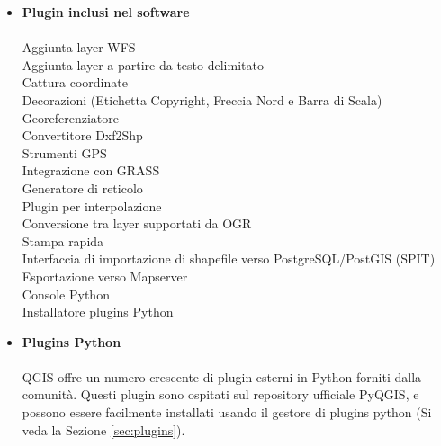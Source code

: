 \begin{itemize}
\item \textbf{Plugin inclusi nel software}
\\ \\ Aggiunta layer WFS
\\ Aggiunta layer a partire da testo delimitato
\\ Cattura coordinate
\\ Decorazioni (Etichetta Copyright, Freccia Nord e Barra di Scala)
\\ Georeferenziatore
\\ Convertitore Dxf2Shp
\\ Strumenti GPS
\\ Integrazione con GRASS
\\ Generatore di reticolo
\\ Plugin per interpolazione
\\ Conversione tra layer supportati da OGR
\\ Stampa rapida
\\ Interfaccia di importazione di shapefile verso PostgreSQL/PostGIS (SPIT)
\\ Esportazione verso Mapserver
\\ Console Python
\\ Installatore plugins Python
\\ \item \textbf{Plugins Python}
\\ \\ QGIS offre un numero crescente di plugin esterni in Python forniti
dalla comunità. Questi plugin sono ospitati sul repository ufficiale
PyQGIS, e possono essere facilmente installati usando il gestore di
plugins python (Si veda la Sezione \ref{sec:plugins}).
\end{itemize}


